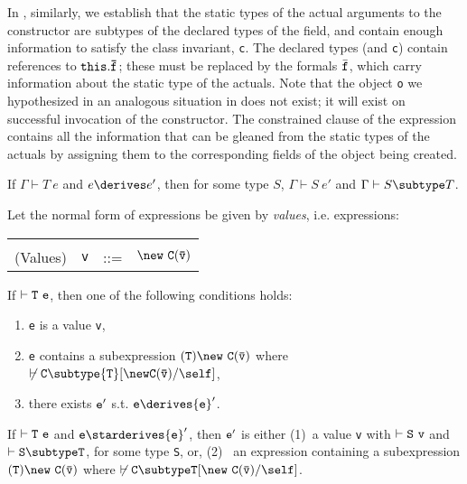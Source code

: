 In \TNew, similarly, we establish that the static types of the actual
arguments to the constructor are subtypes of the declared types of the
field, and contain enough information to satisfy the class invariant,
{\tt c}. The declared types (and {\tt c}) contain references to ${\tt
this.\bar{\tt f}}$; these must be replaced by the formals $\bar{\tt
f}$, which carry information about the static type of the
actuals. Note that the object {\tt o} we hypothesized in an analogous
situation in \TInvk{} does not exist; it will exist on successful
invocation of the constructor. The constrained clause of the \new{}
expression contains all the information that can be gleaned from the
static types of the actuals by assigning them to the corresponding
fields of the object being created.

\begin{theorem} 

If $\Gamma \vdash T\ e$ and $e \derives e'$, then for some type $S$,
$\Gamma \vdash S\ e'$ and $\Gamma \vdash S \subtype T$.

\end{theorem}

Let the normal form of expressions be given by {\em values},
i.e.{} expressions:

\begin{tabular}{rrcl}
&&&\\
(Values) & {\tt v} &{::=}& $\new\ {\tt C(\bar{\tt v})}$
\end{tabular}

\begin{theorem}[Progress] If $\vdash {\tt T\ e}$, then one of the following conditions holds:
\begin{enumerate}
\item {\tt e} is a value {\tt v}, 
\item {\tt e} contains a subexpression ${\tt (T)\new\ C(\bar{\tt v})}$ where
$\not\vdash {\tt C} \subtype {\tt T}[{\tt \new C(\bar{\tt v})}/\self]$,
\item there exists ${\tt e}'$ s.t. ${\tt e} \derives {\tt e}'$.
\end{enumerate}
\end{theorem}

\begin{theorem} 

If $\vdash {\tt T\ e}$ and ${\tt e} \starderives {\tt e}'$, then ${\tt e}'$ is
either (1)~a value {\tt v} with $\vdash {\tt S\ v}$ and $\vdash {\tt S
\subtype T}$, for some type {\tt S}, or, (2)~ an expression containing
a subexpression ${\tt (T)\new\ {\tt C(\bar{\tt v})}}$ where 
$\not\vdash \tt C\subtype T[\new\ C(\bar{\tt v})/\self]$.

\end{theorem}

